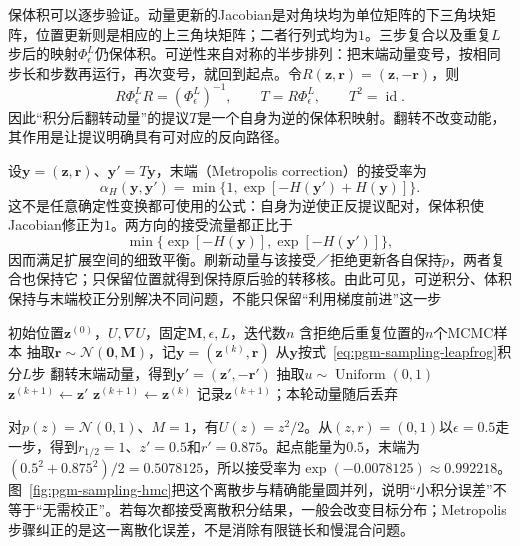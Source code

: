 保体积可以逐步验证。动量更新的Jacobian是对角块均为单位矩阵的下三角块矩阵，位置更新则是相应的上三角块矩阵；二者行列式均为$1$。三步复合以及重复$L$步后的映射$\Phi_{\epsilon}^{L}$仍保体积。可逆性来自对称的半步排列：把末端动量变号，按相同步长和步数再运行，再次变号，就回到起点。令$R(\bm{z},\bm{r})=(\bm{z},-\bm{r})$，则
\begin{equation}
  R\Phi_{\epsilon}^{L}R=(\Phi_{\epsilon}^{L})^{-1},
  \qquad
  T=R\Phi_{\epsilon}^{L},\qquad T^2=\operatorname{id}.
  \label{eq:pgm-sampling-hmc-reversibility}
\end{equation}
因此“积分后翻转动量”的提议$T$是一个自身为逆的保体积映射。翻转不改变动能，其作用是让提议明确具有可对应的反向路径。

设$\bm{y}=(\bm{z},\bm{r})$、$\bm{y}'=T\bm{y}$，末端（Metropolis correction）的接受率为
\begin{equation}
  \alpha_H(\bm{y},\bm{y}')
    =\min\{1,\exp[-H(\bm{y}')+H(\bm{y})]\}.
  \label{eq:pgm-sampling-hmc-acceptance}
\end{equation}
这不是任意确定性变换都可使用的公式：自身为逆使正反提议配对，保体积使Jacobian修正为$1$。两方向的接受流量都正比于
\[
  \min\bigl\{\exp[-H(\bm{y})],\exp[-H(\bm{y}')]\bigr\},
\]
因而满足扩展空间的细致平衡。刷新动量与该接受／拒绝更新各自保持$\widetilde p$，两者复合也保持它；只保留位置就得到保持原后验的转移核。由此可见，可逆积分、体积保持与末端校正分别解决不同问题，不能只保留“利用梯度前进”这一步

\begin{algorithm}[固定步长与轨迹长度的HMC]
  \label{alg:pgm-sampling-hmc}
  \begin{algorithmic}[1]
    \Require 初始位置$\bm{z}^{(0)}$，$U,\nabla U$，固定$\bm{M},\epsilon,L$，迭代数$n$
    \Ensure 含拒绝后重复位置的$n$个MCMC样本
      \State 抽取$\bm{r}\sim\mathcal{N}(\bm{0},\bm{M})$，记$\bm{y}=(\bm{z}^{(k)},\bm{r})$
      \State 从$\bm{y}$按式~\eqref{eq:pgm-sampling-leapfrog}积分$L$步
      \State 翻转末端动量，得到$\bm{y}'=(\bm{z}',-\bm{r}')$
      \State 抽取$u\sim\operatorname{Uniform}(0,1)$
        \State $\bm{z}^{(k+1)}\gets\bm{z}'$
      \Else
        \State $\bm{z}^{(k+1)}\gets\bm{z}^{(k)}$
      \EndIf
      \State 记录$\bm{z}^{(k+1)}$；本轮动量随后丢弃
    \EndFor
  \end{algorithmic}
\end{algorithm}

对$p(z)=\mathcal{N}(0,1)$、$M=1$，有$U(z)=z^2/2$。从$(z,r)=(0,1)$以$\epsilon=0.5$走一步，得到$r_{1/2}=1$、$z'=0.5$和$r'=0.875$。起点能量为$0.5$，末端为$(0.5^2+0.875^2)/2=0.5078125$，所以接受率为$\exp(-0.0078125)\approx0.992218$。图~\ref{fig:pgm-sampling-hmc}把这个离散步与精确能量圆并列，说明“小积分误差”不等于“无需校正”。若每次都接受离散积分结果，一般会改变目标分布；Metropolis步骤纠正的是这一离散化误差，不是消除有限链长和慢混合问题。


